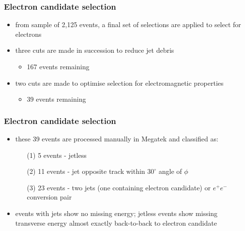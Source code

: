 \documentclass[xcolor=table]{beamer}
\begin{document}

\begin{frame}
\frametitle{Electron candidate selection}
\fontsize{12pt}{12}\selectfont

\begin{itemize}
\item from sample of 2,125 events, a final set of selections are applied to select for electrons
\item three cuts are made in succession to reduce jet debris
\begin{itemize}
\item 167 events remaining
\end{itemize}
\item two cuts are made to optimise selection for electromagnetic properties
\begin{itemize}
\item 39 events remaining
\end{itemize}
\end{itemize}


\end{frame}


\begin{frame}
\frametitle{Electron candidate selection}
\fontsize{11pt}{12}\selectfont

\begin{itemize}
\item these 39 events are processed manually in Megatek and classified as:
\begin{enumerate}
\item[(1)] 5 events - jetless 
\item[(2)] 11 events - jet opposite track within $30^\circ$ angle of $\phi$
\item[(3)] 23 events - two jets (one containing electron candidate) or $e^+e^-$ conversion pair
\end{enumerate}
\item events with jets show no missing energy; jetless events show missing transverse energy almost exactly back-to-back to electron candidate
\end{itemize}


\end{frame}

\end{document}
